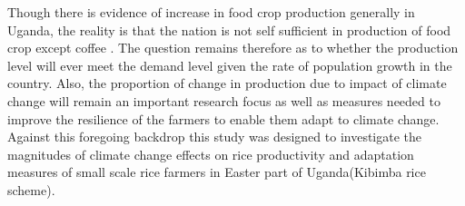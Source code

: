 \documentclass{article}                    %
\begin{document}
Though there is evidence of increase in food crop production generally in Uganda, the reality is that the nation is not self sufficient in production of food crop except coffee . The question remains therefore as to whether the production level will ever meet the demand level given the rate of population growth in the country. Also, the proportion of change in production due to impact of climate change will remain an important research focus as well as measures needed to improve the resilience of the farmers to enable them adapt to climate change. Against this foregoing backdrop this study was designed to investigate the magnitudes of climate change effects on rice productivity and adaptation measures of small scale rice farmers in Easter part of Uganda(Kibimba rice scheme).
\end{document}
